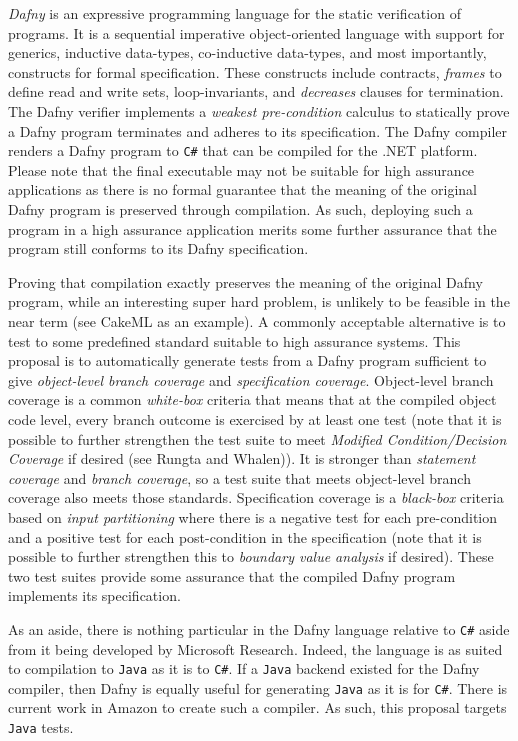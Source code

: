 \documentclass[11pt,onecolumn,notitlepage]{article}
\begin{document}
\emph{Dafny} is an expressive programming language for the static verification of programs. It is a sequential imperative object-oriented language with support for generics, inductive data-types, co-inductive data-types, and most importantly, constructs for formal specification. These constructs include contracts, \emph{frames} to define read and write sets, loop-invariants, and \emph{decreases} clauses for termination. The Dafny verifier implements a \emph{weakest pre-condition} calculus to statically prove a Dafny program terminates and adheres to its specification. The Dafny compiler renders a Dafny program to \texttt{C\#} that can be compiled for the .NET platform. Please note that the final executable may not be suitable for high assurance applications as there is no formal guarantee that the meaning of the original Dafny program is preserved through compilation. As such, deploying such a program in a high assurance application merits some further assurance that the program still conforms to its Dafny specification.  

Proving that compilation exactly preserves the meaning of the original Dafny program, while an interesting super hard problem, is unlikely to be feasible in the near term (see CakeML as an example). A commonly acceptable alternative is to test to some predefined standard suitable to high assurance systems. This proposal is to automatically generate tests from a Dafny program sufficient to give \emph{object-level branch coverage} and \emph{specification coverage}. Object-level branch coverage is a common \emph{white-box} criteria that means that at the compiled object code level, every branch outcome is exercised by at least one test (note that it is possible to further strengthen the test suite to meet \emph{Modified Condition/Decision Coverage} if desired (see Rungta and Whalen)). It is stronger than \emph{statement coverage} and \emph{branch coverage}, so a test suite that meets object-level branch coverage also meets those standards. Specification coverage is a \emph{black-box} criteria based on \emph{input partitioning} where there is a negative test for each pre-condition and a positive test for each post-condition in the specification (note that it is possible to further strengthen this to \emph{boundary value analysis} if desired). These two test suites provide some assurance that the compiled Dafny program implements its specification.

As an aside, there is nothing particular in the Dafny language relative to \texttt{C\#} aside from it being developed by Microsoft Research. Indeed, the language is as suited to compilation to \texttt{Java} as it is to \texttt{C\#}. If a \texttt{Java} backend existed for the Dafny compiler, then Dafny is equally useful for generating \texttt{Java} as it is for \texttt{C\#}. There is current work in Amazon to create such a compiler. As such, this proposal targets \texttt{Java} tests.
\end{document}
